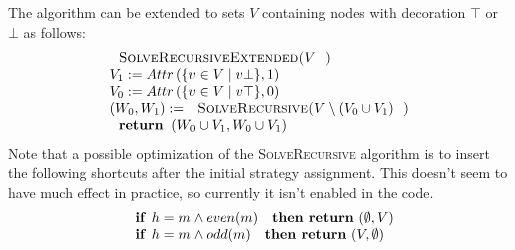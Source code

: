 The algorithm can be extended to sets $V$ containing nodes with decoration $%
\top $ or $\bot $ as follows:%
\begin{equation*}
\begin{array}{l}
\text{\textsc{SolveRecursiveExtended(}}V\text{\textsc{)}} \\ 
V_{1}:=Attr\left( \{v\in V\mid v\bot \},1\right)  \\ 
V_{0}:=Attr\left( \{v\in V\mid v\top \},0\right)  \\ 
\left( W_{0},W_{1}\right) :=\text{\textsc{SolveRecursive(}}V\setminus
(V_{0}\cup V_{1})\text{\textsc{)}} \\ 
\text{\textbf{return }}\left( W_{0}\cup V_{1},W_{0}\cup V_{1}\right) 
\end{array}%
\end{equation*}%
Note that a possible optimization of the \textsc{SolveRecursive} algorithm
is to insert the following shortcuts after the initial strategy assignment.
This doesn't seem to have much effect in practice, so currently it isn't
enabled in the code.%
\begin{equation*}
\begin{array}{l}
\text{\textbf{if }}h=m\wedge even(m)\text{ \textbf{then return} }(\emptyset
,V) \\ 
\text{\textbf{if }}h=m\wedge odd(m)\text{ \textbf{then return} }(V,\emptyset
)%
\end{array}%
\end{equation*}%
\newpage 

